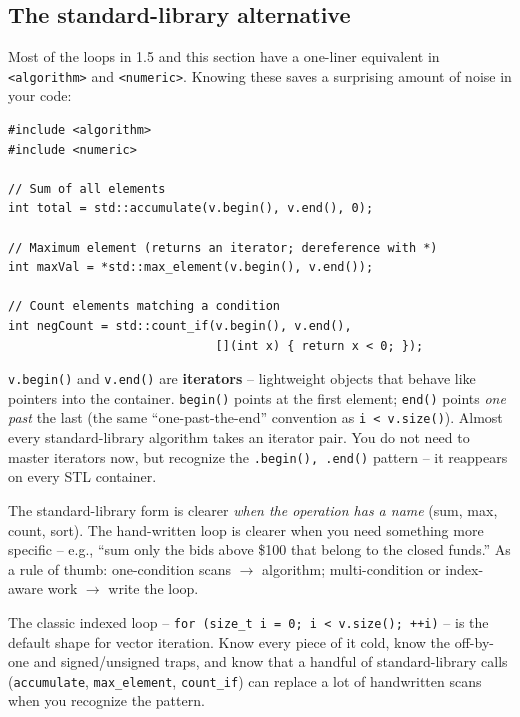 \documentclass[11pt]{article}
\begin{document}
\subsection{The standard-library alternative}

Most of the loops in 1.5 and this section have a one-liner equivalent
in \texttt{<algorithm>} and \texttt{<numeric>}. Knowing these saves a
surprising amount of noise in your code:

\begin{lstlisting}
#include <algorithm>
#include <numeric>

// Sum of all elements
int total = std::accumulate(v.begin(), v.end(), 0);

// Maximum element (returns an iterator; dereference with *)
int maxVal = *std::max_element(v.begin(), v.end());

// Count elements matching a condition
int negCount = std::count_if(v.begin(), v.end(),
                             [](int x) { return x < 0; });
\end{lstlisting}

\begin{ideabox}
\texttt{v.begin()} and \texttt{v.end()} are \textbf{iterators} --
lightweight objects that behave like pointers into the container.
\texttt{begin()} points at the first element; \texttt{end()} points
\emph{one past} the last (the same ``one-past-the-end'' convention as
\texttt{i < v.size()}). Almost every standard-library algorithm
takes an iterator pair. You do not need to master iterators now, but
recognize the \texttt{.begin(), .end()} pattern -- it reappears on
every STL container.
\end{ideabox}

\begin{notebox}
The standard-library form is clearer \emph{when the operation has a
name} (sum, max, count, sort). The hand-written loop is clearer when
you need something more specific -- e.g., ``sum only the bids above
\$100 that belong to the closed funds.'' As a rule of thumb:
one-condition scans $\rightarrow$ algorithm; multi-condition or
index-aware work $\rightarrow$ write the loop.
\end{notebox}

\begin{ideabox}
The classic indexed loop -- \texttt{for (size\_t i = 0; i < v.size();
++i)} -- is the default shape for vector iteration. Know every piece
of it cold, know the off-by-one and signed/unsigned traps, and know
that a handful of standard-library calls
(\texttt{accumulate}, \texttt{max\_element}, \texttt{count\_if}) can
replace a lot of handwritten scans when you recognize the pattern.
\end{ideabox}
\end{document}
